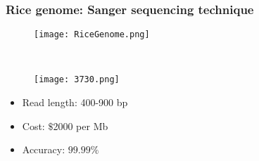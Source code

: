 \documentclass[mathserif]{beamer}
\begin{document}
	
	\begin{frame}
		\frametitle{Rice genome: Sanger sequencing technique} 
				
\begin{figure}%
   \begin{center}%
     \begin{minipage}{0.20\textwidth}%
      \texttt{[image: RiceGenome.png]}%
     \end{minipage}%
     \ 
     \begin{minipage}{0.35\textwidth}
      \texttt{[image: 3730.png]}
     \end{minipage}%
   \end{center}
 \end{figure}
\begin{itemize}
	\item Read length: 400-900 bp
	\item Cost: $\$$2000 per Mb
	\item Accuracy: $99.99\%$
\end{itemize}



		
		
	\end{frame}
\end{document}
